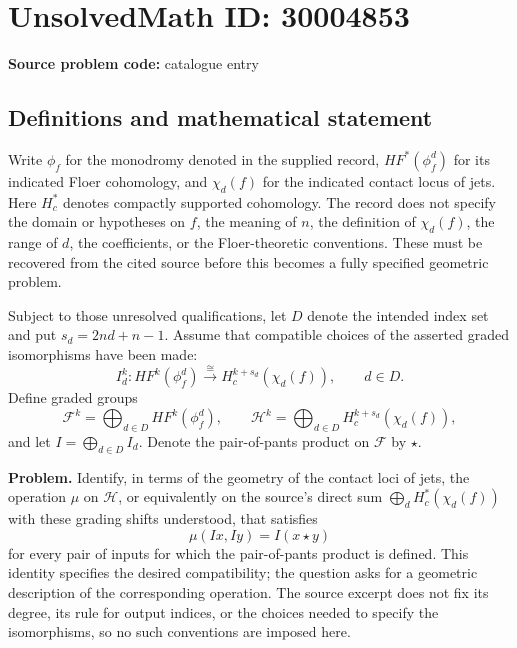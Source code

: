 \documentclass[11pt]{article}
\begin{document}
\section*{UnsolvedMath ID: 30004853}
\textbf{Source problem code:} catalogue entry
\subsection{Definitions and mathematical statement}
Write \(\phi_f\) for the monodromy denoted in the supplied record, \(HF^*(\phi_f^d)\) for its indicated Floer cohomology, and \(\chi_d(f)\) for the indicated contact locus of jets. Here \(H_c^*\) denotes compactly supported cohomology. The record does not specify the domain or hypotheses on \(f\), the meaning of \(n\), the definition of \(\chi_d(f)\), the range of \(d\), the coefficients, or the Floer-theoretic conventions. These must be recovered from the cited source before this becomes a fully specified geometric problem.

Subject to those unresolved qualifications, let \(D\) denote the intended index set and put \(s_d=2nd+n-1\). Assume that compatible choices of the asserted graded isomorphisms have been made:
\[
I_d^k:HF^k(\phi_f^d)\xrightarrow{\ \cong\ }H_c^{k+s_d}(\chi_d(f)),\qquad d\in D.
\]
Define graded groups
\[
\mathcal F^k=\bigoplus_{d\in D}HF^k(\phi_f^d),\qquad
\mathcal H^k=\bigoplus_{d\in D}H_c^{k+s_d}(\chi_d(f)),
\]
and let \(I=\bigoplus_{d\in D}I_d\). Denote the pair-of-pants product on \(\mathcal F\) by \(\star\).

\textbf{Problem.} Identify, in terms of the geometry of the contact loci of jets, the operation \(\mu\) on \(\mathcal H\), or equivalently on the source's direct sum \(\bigoplus_d H_c^*(\chi_d(f))\) with these grading shifts understood, that satisfies
\[
\mu(Ix,Iy)=I(x\star y)
\]
for every pair of inputs for which the pair-of-pants product is defined. This identity specifies the desired compatibility; the question asks for a geometric description of the corresponding operation. The source excerpt does not fix its degree, its rule for output indices, or the choices needed to specify the isomorphisms, so no such conventions are imposed here.
\end{document}
